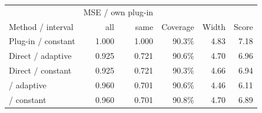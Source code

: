 
\begin{tabular}{@{}lrrrrr@{}}
\toprule
& \multicolumn{2}{c}{MSE / own plug-in} & & & \\
Method / interval & all & same & Coverage & Width & Score \\
\midrule
Plug-in / constant & 1.000 & 1.000 & 90.3\% & 4.83 & 7.18 \\
Direct / adaptive & 0.925 & 0.721 & 90.6\% & 4.70 & 6.96 \\
Direct / constant & 0.925 & 0.721 & 90.3\% & 4.66 & 6.94 \\
\method{} / adaptive & 0.960 & 0.701 & 90.6\% & 4.46 & 6.11 \\
\method{} / constant & 0.960 & 0.701 & 90.8\% & 4.70 & 6.89 \\
\bottomrule
\end{tabular}
